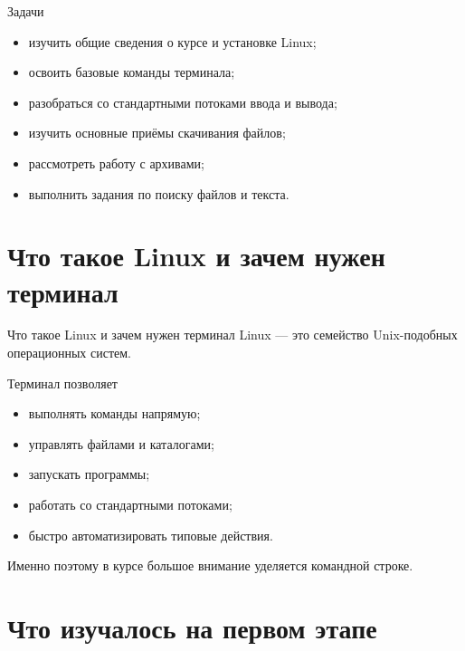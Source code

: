 \documentclass[
  11pt,
  ignorenonframetext,
  aspectratio=169,
  russian,
]{beamer}
\providecommand{\tightlist}{%
  \setlength{\itemsep}{0pt}\setlength{\parskip}{0pt}}
\begin{document}
\begin{frame}{Задачи}
\protect{}\label{ux437ux430ux434ux430ux447ux438}
\begin{itemize}[<+->]
\tightlist
\item
  изучить общие сведения о курсе и установке Linux;
\item
  освоить базовые команды терминала;
\item
  разобраться со стандартными потоками ввода и вывода;
\item
  изучить основные приёмы скачивания файлов;
\item
  рассмотреть работу с архивами;
\item
  выполнить задания по поиску файлов и текста.
\end{itemize}
\end{frame}

\section{Что такое Linux и зачем нужен
терминал}\label{ux447ux442ux43e-ux442ux430ux43aux43eux435-linux-ux438-ux437ux430ux447ux435ux43c-ux43dux443ux436ux435ux43d-ux442ux435ux440ux43cux438ux43dux430ux43b}

\begin{frame}{Что такое Linux и зачем нужен терминал}
Linux --- это семейство Unix-подобных операционных систем.
\end{frame}

\begin{frame}{Терминал позволяет}
\protect{}\label{ux442ux435ux440ux43cux438ux43dux430ux43b-ux43fux43eux437ux432ux43eux43bux44fux435ux442}
\begin{itemize}[<+->]
\tightlist
\item
  выполнять команды напрямую;
\item
  управлять файлами и каталогами;
\item
  запускать программы;
\item
  работать со стандартными потоками;
\item
  быстро автоматизировать типовые действия.
\end{itemize}

Именно поэтому в курсе большое внимание уделяется командной строке.
\end{frame}

\section{Что изучалось на первом
этапе}\label{ux447ux442ux43e-ux438ux437ux443ux447ux430ux43bux43eux441ux44c-ux43dux430-ux43fux435ux440ux432ux43eux43c-ux44dux442ux430ux43fux435}
\end{document}
